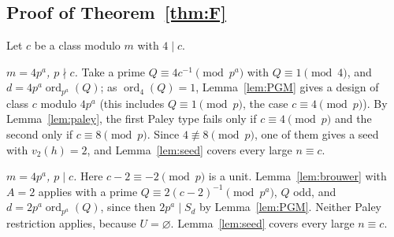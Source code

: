 \documentclass[10pt]{article}
\theoremstyle{remark}
\newcommand{\ord}{\operatorname{ord}}
\begin{document}
\subsection{Proof of Theorem~\ref{thm:F}}
Let $c$ be a class modulo $m$ with $4\mid c$.

\emph{$m=4p^a$, $p\nmid c$.} Take a prime $Q\equiv4c^{-1}\pmod{p^a}$ with $Q\equiv1\pmod4$, and $d=4p^a\ord_{p^a}(Q)$; as $\ord_4(Q)=1$, Lemma~\ref{lem:PGM} gives a design of class $c$ modulo $4p^a$ (this includes $Q\equiv1\pmod p$, the case $c\equiv4\pmod p$). By Lemma~\ref{lem:paley}, the first Paley type fails only if $c\equiv4\pmod p$ and the second only if $c\equiv8\pmod p$. Since $4\not\equiv8\pmod p$, one of them gives a seed with $v_2(h)=2$, and Lemma~\ref{lem:seed} covers every large $n\equiv c$.

\emph{$m=4p^a$, $p\mid c$.} Here $c-2\equiv-2\pmod p$ is a unit. Lemma~\ref{lem:brouwer} with $A=2$ applies with a prime $Q\equiv2(c-2)^{-1}\pmod{p^a}$, $Q$ odd, and $d=2p^a\ord_{p^a}(Q)$, since then $2p^a\mid S_d$ by Lemma~\ref{lem:PGM}. Neither Paley restriction applies, because $U=\varnothing$. Lemma~\ref{lem:seed} covers every large $n\equiv c$.
\end{document}
